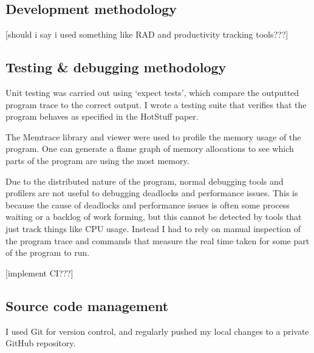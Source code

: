 \subsection{Development methodology}
[should i say i used something like RAD and productivity tracking tools???]
\subsection{Testing \& debugging methodology} \label{testing}
Unit testing was carried out using `expect tests', which compare the outputted program trace to the correct output. I wrote a testing suite that verifies that the program behaves as specified in the HotStuff paper.

The Memtrace library and viewer were used to profile the memory usage of the program. One can generate a flame graph of memory allocations to see which parts of the program are using the most memory.










Due to the distributed nature of the program, normal debugging tools and profilers are not useful to debugging deadlocks and performance issues. This is because the cause of deadlocks and performance issues is often some process waiting or a backlog of work forming, but this cannot be detected by tools that just track things like CPU usage. Instead I had to rely on manual inspection of the program trace and commands that measure the real time taken for some part of the program to run.

[implement CI???]
\subsection{Source code management}
I used Git for version control, and regularly pushed my local changes to a private GitHub repository.